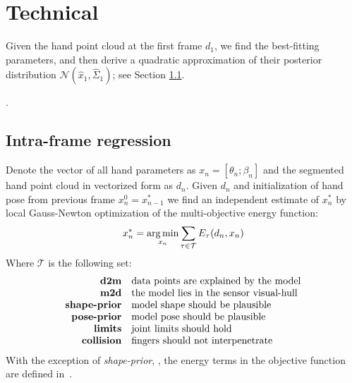 \section{Technical}
Given the hand point cloud at the first frame $d_1$, we find the best-fitting parameters, and then derive a quadratic approximation of their posterior distribution $\mathcal{N}(\hat x_1, \hat \Sigma_1)$; see Section \ref{sec:independent}.

.

\subsection{Intra-frame regression }
\label{sec:independent}
% 
Denote the vector of all hand parameters as $x_n = [\theta_n; \beta_n]$ and the segmented hand point cloud in vectorized form as $d_n$. Given $d_n$ and initialization of hand pose from previous frame $x_n^0 = x_{n - 1}^*$ we find an independent estimate of $x_n^*$ by local Gauss-Newton optimization of the multi-objective energy function:
% 
\begin{equation}
x_n^* = \operatorname*{arg\,min}_{x_n} \sum_{\tau \in \mathcal{T}} E_{\tau}(d_n, x_n) \label{eq:energies}
\end{equation}
% 
Where $\mathcal{T}$ is the following set:
%
\vspace{-.5\parskip}
\begin{equation*}
\setlength{\jot}{0pt}
\begin{aligned}
\text{\textbf{d2m}} & \quad \text{data points are explained by the model} \\ 
\text{\textbf{m2d}} & \quad \text{the model lies in the sensor visual-hull} \\
\text{\textbf{shape-prior}} & \quad \text{model shape should be plausible} \\
\text{\textbf{pose-prior}} & \quad \text{model pose should be plausible} \\
\text{\textbf{limits}} & \quad \text{joint limits should hold} \\
\text{\textbf{collision}} & \quad \text{fingers should not interpenetrate} 
\end{aligned}
\end{equation*}
With the exception of \emph{shape-prior}, , the energy terms in the objective function are defined in~\cite{tkach2016sphere}.

